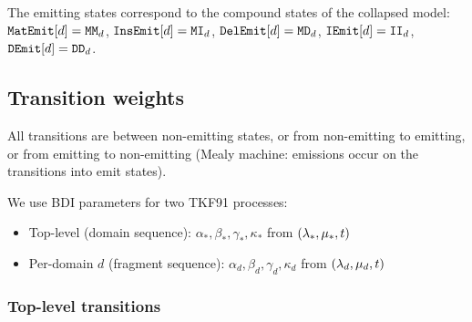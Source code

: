 \documentclass{article}
\begin{document}
The emitting states correspond to the compound states of the collapsed model:
$\mathtt{MatEmit}[d] = \mathtt{MM}_d$, $\mathtt{InsEmit}[d] = \mathtt{MI}_d$,
$\mathtt{DelEmit}[d] = \mathtt{MD}_d$, $\mathtt{IEmit}[d] = \mathtt{II}_d$,
$\mathtt{DEmit}[d] = \mathtt{DD}_d$.

\subsection{Transition weights}

All transitions are between non-emitting states, or from non-emitting to
emitting, or from emitting to non-emitting (Mealy machine: emissions occur
on the transitions into emit states).

We use BDI parameters for two TKF91 processes:
\begin{itemize}[nosep]
\item Top-level (domain sequence): $\alpha_*, \beta_*, \gamma_*, \kappa_*$
  from $(\lambda_*, \mu_*, t)$
\item Per-domain $d$ (fragment sequence): $\alpha_d, \beta_d, \gamma_d, \kappa_d$
  from $(\lambda_d, \mu_d, t)$
\end{itemize}

\subsubsection{Top-level transitions}
\end{document}
